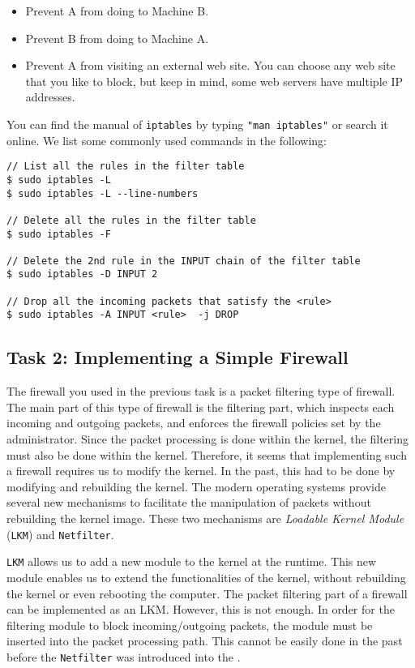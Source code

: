 \begin{itemize}
\item Prevent A from doing \telnet to Machine B.
\item Prevent B from doing \telnet to Machine A.
\item Prevent A from visiting an external web site. You can choose any web
site that you like to block, but keep in mind, some web servers have multiple
IP addresses. 
\end{itemize}


You can find the manual of {\tt iptables} by typing {\tt "man iptables"} or search it
online. We list some commonly used commands 
in the following:


\begin{lstlisting}
// List all the rules in the filter table
$ sudo iptables -L
$ sudo iptables -L --line-numbers

// Delete all the rules in the filter table
$ sudo iptables -F

// Delete the 2nd rule in the INPUT chain of the filter table 
$ sudo iptables -D INPUT 2

// Drop all the incoming packets that satisfy the <rule>
$ sudo iptables -A INPUT <rule>  -j DROP
\end{lstlisting}
 


\subsection{Task 2: Implementing a Simple Firewall} 

The firewall you used in the previous task is a packet filtering 
type of firewall. The main part of this type of firewall is the filtering part, 
which inspects each incoming and outgoing packets, and enforces the firewall policies 
set by the administrator. Since the packet 
processing is done within the kernel, the filtering must also be 
done within the kernel. Therefore, it seems that implementing such
a firewall requires us to modify the \linux kernel. In the past, 
this had to be done by modifying and rebuilding 
the kernel. The modern \linux 
operating systems provide several new mechanisms 
to facilitate the manipulation of packets without rebuilding
the kernel image. These two mechanisms are 
\textit{Loadable Kernel Module} ({\tt LKM}) and {\tt Netfilter}.
 

{\tt LKM} allows us to add a new module to the kernel at the runtime. 
This new module enables us to extend the functionalities of the kernel,
without rebuilding the kernel or even rebooting the computer. 
The packet filtering part of a firewall can be implemented 
as an LKM. However, this is not enough. In order for the filtering module to 
block incoming/outgoing packets, the module 
must be inserted into the packet processing path. 
This cannot be easily done in the past before 
the {\tt Netfilter} was introduced into the \linux.


